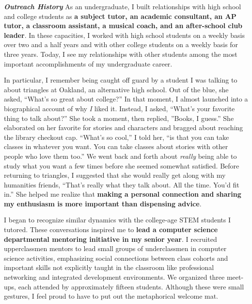 \textit{\textbf{Outreach History}}
As an undergraduate, I built relationships with high school and college students as \textbf{a subject tutor, an academic consultant, an AP tutor, a classroom assistant, a musical coach, and an after-school club leader}.
In these capacities, I worked with high school students on a weekly basis over two and a half years and with other college students on a weekly basis for three years.
Today, I see my relationships with other students among the most important accomplishments of my undergraduate career.

In particular, I remember being caught off guard by a student I was talking to about triangles at Oakland, an alternative high school.
Out of the blue, she asked, ``What's so great about college?''
In that moment, I almost launched into a biographical account of why \textit{I} liked it.
Instead, I asked, ``What's your favorite thing to talk about?''
She took a moment, then replied, ''Books, I guess.''
She elaborated on her favorite for stories and characters and bragged about reaching the library checkout cap.
``What's so cool,'' I told her, ``is that you can take classes in whatever you want.
You can take classes about stories with other people who love them too.''
We went back and forth about \textit{really} being able to study what you want a few times before she seemed somewhat satisfied.
Before returning to triangles, I suggested that she would really get along with my humanities friends,
``That's really what they talk about.
All the time.
You'd fit in.''
She helped me realize that \textbf{making a personal connection and sharing my enthusiasm is more important than dispensing advice}.

I began to recognize similar dynamics with the college-age STEM students I tutored.
These conversations inspired me to \textbf{lead a computer science departmental mentoring initiative in my senior year}.
I recruited upperclassmen mentors to lead small groups of underclassmen in computer science activities, emphasizing social connections between class cohorts and important skills not explicitly taught in the classroom like professional networking and integrated development environments.
We organized three meet-ups, each attended by approximately fifteen students.
Although these were small gestures, I feel proud to have to put out the metaphorical welcome mat.
